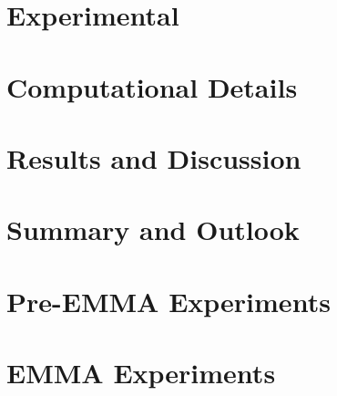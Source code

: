 \documentclass[a4paper,twoside]{report}
\begin{document}
\chapter{Experimental}
\label{sec:exp}


\newpage
\chapter{Computational Details}
\label{sec:comp}


\chapter{Results and Discussion}
\label{sec:results}





\chapter{Summary and Outlook}
\label{sec:outlook}



%


\clearpage

\appendix
%
\chapter{Pre-EMMA Experiments}
\label{sec:app-pre-emma}

%
\chapter{EMMA Experiments}
\label{sec:app-emma}

%
\end{document}
